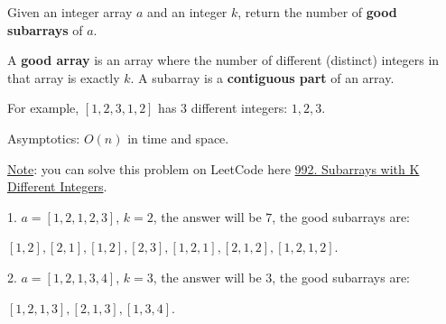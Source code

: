 
\begin{problem}

    Given an integer array $a$ and an integer $k$, return the number of \textbf{good subarrays} of $a$.

    A \textbf{good array} is an array where the number of different (distinct) integers in that array is exactly $k$. A subarray is a \textbf{contiguous part} of an array.

    For example, $[1, 2, 3, 1, 2]$ has $3$ different integers: $1, 2, 3$.

    Asymptotics: $O(n)$ in time and space. \newline


    \underline{Note}: you can solve this problem on LeetCode here \href{https://leetcode.com/problems/subarrays-with-k-different-integers/description/}{992. Subarrays with K Different Integers}.

\end{problem}

\begin{example}

    1. $a = [1,2,1,2,3]$, $k = 2$, the answer will be $7$, the good subarrays are:

    $[1,2], [2,1], [1,2], [2,3], [1,2,1], [2,1,2], [1,2,1,2]$.\newline

    2. $a = [1,2,1,3,4]$, $k = 3$, the answer will be $3$, the good subarrays are:

    $[1,2,1,3], [2,1,3], [1,3,4]$.

\end{example}



